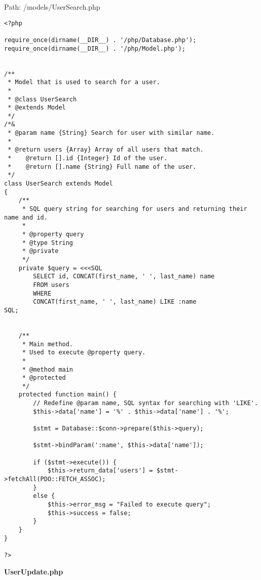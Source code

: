 Path: /models/UserSearch.php
{\scriptsize
\begin{lstlisting}
<?php

require_once(dirname(__DIR__) . '/php/Database.php');
require_once(dirname(__DIR__) . '/php/Model.php');


/**
 * Model that is used to search for a user.
 *
 * @class UserSearch
 * @extends Model
 */
/*&
 * @param name {String} Search for user with similar name.
 *
 * @return users {Array} Array of all users that match.
 *    @return [].id {Integer} Id of the user.
 *    @return [].name {String} Full name of the user.
 */
class UserSearch extends Model
{
	/**
	 * SQL query string for searching for users and returning their name and id.
	 *
	 * @property query
	 * @type String
	 * @private
	 */
	private $query = <<<SQL
		SELECT id, CONCAT(first_name, ' ', last_name) name
		FROM users
		WHERE
		CONCAT(first_name, ' ', last_name) LIKE :name
SQL;


	/**
	 * Main method.
	 * Used to execute @property query.
	 *
	 * @method main
	 * @protected
	 */
	protected function main() {
		// Redefine @param name, SQL syntax for searching with 'LIKE'.
		$this->data['name'] = '%' . $this->data['name'] . '%';

		$stmt = Database::$conn->prepare($this->query);
		
		$stmt->bindParam(':name', $this->data['name']);

		if ($stmt->execute()) {
			$this->return_data['users'] = $stmt->fetchAll(PDO::FETCH_ASSOC);
		}
		else {
			$this->error_msg = "Failed to execute query";
			$this->success = false;
		}
	}
}

?>
\end{lstlisting}
}
\textbf{UserUpdate.php}

